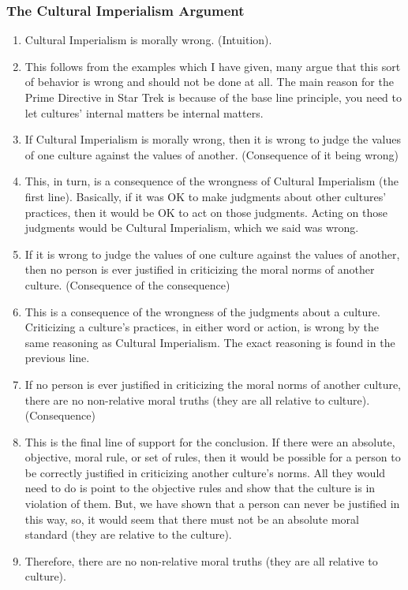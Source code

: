 \subsubsection{The Cultural Imperialism Argument}

\begin{enumerate}
    \item Cultural Imperialism is morally wrong. (Intuition).
    \item This follows from the examples which I have given, many argue that this sort of behavior is wrong and should not be done at all. The main reason for the Prime Directive in Star Trek is because of the base line principle, you need to let cultures' internal matters be internal matters. 
    \item If Cultural Imperialism is morally wrong, then it is wrong to judge the values of one culture against the values of another. (Consequence of it being wrong)
    \item This, in turn, is a consequence of the wrongness of Cultural Imperialism (the first line). Basically, if it was OK to make judgments about other cultures' practices, then it would be OK to act on those judgments. Acting on those judgments would be Cultural Imperialism, which we said was wrong.   
    \item If it is wrong to judge the values of one culture against the values of another, then no person is ever justified in criticizing the moral norms of another culture. (Consequence of the consequence)
    \item This is a consequence of the wrongness of the judgments about a culture. Criticizing a culture's practices, in either word or action, is wrong by the same reasoning as Cultural Imperialism. The exact reasoning is found in the previous line. 
    \item If no person is ever justified in criticizing the moral norms of another culture, there are no non-relative moral truths (they are all relative to culture). (Consequence)
    \item This is the final line of support for the conclusion. If there were an absolute, objective, moral rule, or set of rules, then it would be possible for a person to be correctly justified in criticizing another culture's norms. All they would need to do is point to the objective rules and show that the culture is in violation of them. But, we have shown that a person can never be justified in this way, so, it would seem that there must not be an absolute moral standard (they are relative to the culture).
    \item Therefore, there are no non-relative moral truths (they are all relative to culture).
\end{enumerate}

